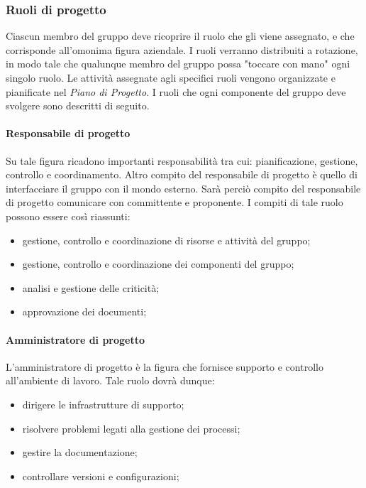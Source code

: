 		\subsubsection{Ruoli di progetto}
		Ciascun membro del gruppo deve ricoprire il ruolo che gli viene assegnato, e che corrisponde all'omonima figura aziendale. I ruoli verranno distribuiti a rotazione, in modo tale che qualunque membro del gruppo possa "toccare con mano" ogni singolo ruolo. Le attività assegnate agli specifici ruoli vengono organizzate e pianificate nel \textit{Piano di Progetto}. I ruoli che ogni componente del gruppo deve svolgere sono descritti di seguito.
		
			\paragraph{Responsabile di progetto}
			Su tale figura ricadono importanti responsabilità tra cui: pianificazione, gestione, controllo e coordinamento. Altro compito del responsabile di progetto è quello di interfacciare il gruppo con il mondo esterno. Sarà perciò compito del responsabile di progetto comunicare con committente e proponente. I compiti di tale ruolo possono essere così riassunti:
			\begin{itemize}
				\item gestione, controllo e coordinazione di risorse e attività del gruppo;
				\item gestione, controllo e coordinazione dei componenti del gruppo;
				\item analisi e gestione delle criticità;
				\item approvazione dei documenti;
			\end{itemize}
		
			\paragraph{Amministratore di progetto}
			L'amministratore di progetto è la figura che fornisce supporto e controllo all'ambiente di lavoro. Tale ruolo dovrà dunque:
			\begin{itemize}
				\item dirigere le infrastrutture di supporto;
				\item risolvere problemi legati alla gestione dei processi;
				\item gestire la documentazione;
				\item controllare versioni e configurazioni;
			\end{itemize}
		
